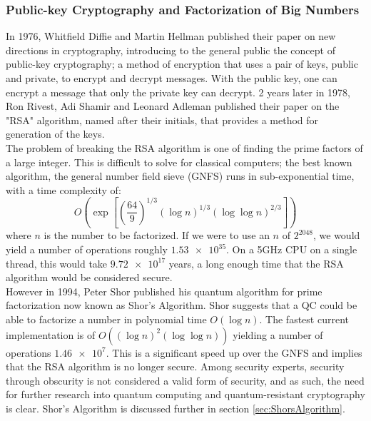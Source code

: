 \documentclass[reqno]{amsart}
\numberwithin{equation}{section}
\numberwithin{figure}{section}
\begin{document}
\subsubsection{Public-key Cryptography and Factorization of Big Numbers} \label{sec:PublickeyCryptography}
\begin{justify}
In 1976, Whitfield Diffie and Martin Hellman published their paper on new directions in cryptography, \cite{DiffieHellman1976} introducing to the general public the concept of public-key cryptography; a method of encryption that uses a pair of keys, public and private, to encrypt and decrypt messages. With the public key, one can encrypt a message that only the private key can decrypt. 2 years later in 1978, Ron Rivest, Adi Shamir and Leonard Adleman published their paper on the "RSA" algorithm, named after their initials, that provides a method for generation of the keys. \cite{RSA1978}\\

The problem of breaking the RSA algorithm is one of finding the prime factors of a large integer. This is difficult to solve for classical computers; the best known algorithm, the general number field sieve (GNFS) \cite{Briggs1998} runs in sub-exponential time, with a time complexity of:
    \begin{equation*}
        O\left(\exp\left[\left(\frac{64}{9}\right)^{1/3}(\log n)^{1/3}(\log \log n)^{2/3}\right]\right) 
    \end{equation*}
    where $n$ is the number to be factorized. If we were to use an $n$ of $2^{2048}$, we would yield a number of operations roughly $\num{1.53e35}$. On a 5GHz CPU on a single thread, this would take $\num{9.72e17}$ years, a long enough time that the RSA algorithm would be considered secure. \\

    However in 1994, Peter Shor published his quantum algorithm for prime factorization \cite{Shor1994} now known as Shor's Algorithm. Shor suggests that a QC could be able to factorize a number in polynomial time $O(\log n)$. The fastest current implementation is of $O((\log n)^{2}(\log \log n))$ \cite{Beckman1996, HarveyHoeeven2021} yielding a number of operations $\num{1.46e7}$. This is a significant speed up over the GNFS and implies that the RSA algorithm is no longer secure. Among security experts, security through obscurity is not considered a valid form of security, \cite{ScarfoneJansenTracy2008} and as such, the need for further research into quantum computing and quantum-resistant cryptography is clear. Shor's Algorithm is discussed further in section \ref{sec:ShorsAlgorithm}.
\end{justify}
\end{document}
